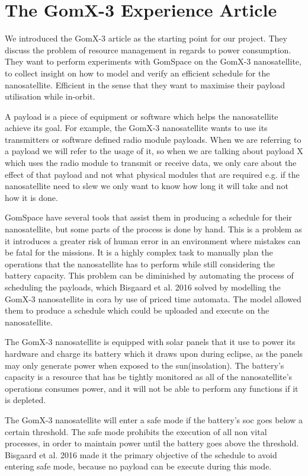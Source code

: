 \section{The GomX-3 Experience Article} \label{sec:gomx3}
We introduced the GomX-3 article as the starting point for our project. They discuss the problem of resource management in regards to power consumption. They want to perform experiments with GomSpace on the GomX-3 nanosatellite, to collect insight on how to model and verify an efficient schedule for the nanosatellite. Efficient in the sense that they want to maximise their payload utilisation while in-orbit. 

A payload is a piece of equipment or software which helps the nanosatellite achieve its goal. For example, the GomX-3 nanosatellite wants to use its transmitters or software defined radio module payloads. When we are referring to a payload we will refer to the usage of it, so when we are talking about payload X which uses the radio module to transmit or receive data, we only care about the effect of that payload and not what physical modules that are required e.g. if the nanosatellite need to slew we only want to know how long it will take and not how it is done.

GomSpace have several tools that assist them in producing a schedule for their nanosatellite, but some parts of the process is done by hand. This is a problem as it introduces a greater risk of human error in an environment where mistakes can be fatal for the missions. It is a highly complex task to manually plan the operations that the nanosatellite has to perform while still considering the battery capacity. This problem can be diminished by automating the process of scheduling the payloads, which Bisgaard et al. 2016\cite{gomx3} solved by modelling the GomX-3 nanosatellite in \gls{cora} by use of priced time automata. The model allowed them to produce a schedule which could be uploaded and execute on the nanosatellite.

The GomX-3 nanosatellite is equipped with solar panels that it use to power its hardware and charge its battery which it draws upon during eclipse, as the panels may only generate power when exposed to the sun(insolation). The battery's capacity is a resource that has be tightly monitored as all of the nanosatellite's operations consumes power, and it will not be able to perform any functions if it is depleted.\cite{gomx3}

The GomX-3 nanosatellite will enter a safe mode if the battery's \gls{soc} goes below a certain threshold. The safe mode prohibits the execution of all non vital processes, in order to maintain power until the battery goes above the threshold. Bisgaard et al. 2016\cite{gomx3} made it the primary objective of the schedule to avoid entering safe mode, because no payload can be execute during this mode.

